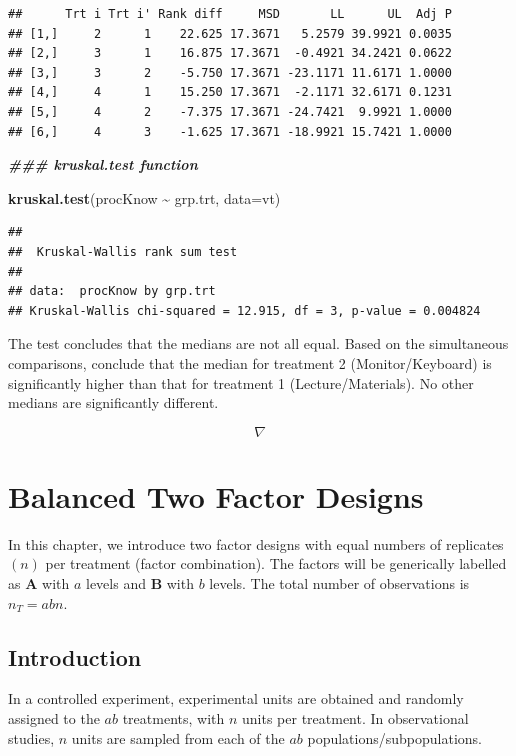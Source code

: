 \documentclass[
]{book}
\newenvironment{Shaded}{\begin{snugshade}}{\end{snugshade}}
\newcommand{\AttributeTok}[1]{\textcolor[rgb]{0.13,0.29,0.53}{#1}}
\newcommand{\DocumentationTok}[1]{\textcolor[rgb]{0.56,0.35,0.01}{\textbf{\textit{#1}}}}
\newcommand{\FunctionTok}[1]{\textcolor[rgb]{0.13,0.29,0.53}{\textbf{#1}}}
\newcommand{\NormalTok}[1]{#1}
\newcommand{\SpecialCharTok}[1]{\textcolor[rgb]{0.81,0.36,0.00}{\textbf{#1}}}
\begin{document}
\begin{verbatim}
##      Trt i Trt i' Rank diff     MSD       LL      UL  Adj P
## [1,]     2      1    22.625 17.3671   5.2579 39.9921 0.0035
## [2,]     3      1    16.875 17.3671  -0.4921 34.2421 0.0622
## [3,]     3      2    -5.750 17.3671 -23.1171 11.6171 1.0000
## [4,]     4      1    15.250 17.3671  -2.1171 32.6171 0.1231
## [5,]     4      2    -7.375 17.3671 -24.7421  9.9921 1.0000
## [6,]     4      3    -1.625 17.3671 -18.9921 15.7421 1.0000
\end{verbatim}

\begin{Shaded}
\begin{Highlighting}[]
\DocumentationTok{\#\#\# kruskal.test function}

\FunctionTok{kruskal.test}\NormalTok{(procKnow }\SpecialCharTok{\textasciitilde{}}\NormalTok{ grp.trt, }\AttributeTok{data=}\NormalTok{vt)}
\end{Highlighting}
\end{Shaded}

\begin{verbatim}
## 
##  Kruskal-Wallis rank sum test
## 
## data:  procKnow by grp.trt
## Kruskal-Wallis chi-squared = 12.915, df = 3, p-value = 0.004824
\end{verbatim}

The test concludes that the medians are not all equal. Based on the
simultaneous comparisons, conclude that the median for treatment 2
(Monitor/Keyboard) is significantly higher than that for treatment 1
(Lecture/Materials). No other medians are significantly different.

\[\nabla \]

\chapter{Balanced Two Factor Designs}\label{balanced-two-factor-designs}

In this chapter, we introduce two factor designs with equal numbers of
replicates \((n)\) per treatment (factor combination). The factors will
be generically labelled as \textbf{A} with \(a\) levels and \textbf{B}
with \(b\) levels. The total number of observations is \(n_T=abn\).

\section{Introduction}\label{introduction-1}

In a controlled experiment, experimental units are obtained and randomly
assigned to the \(ab\) treatments, with \(n\) units per treatment. In
observational studies, \(n\) units are sampled from each of the \(ab\)
populations/subpopulations.
\end{document}
